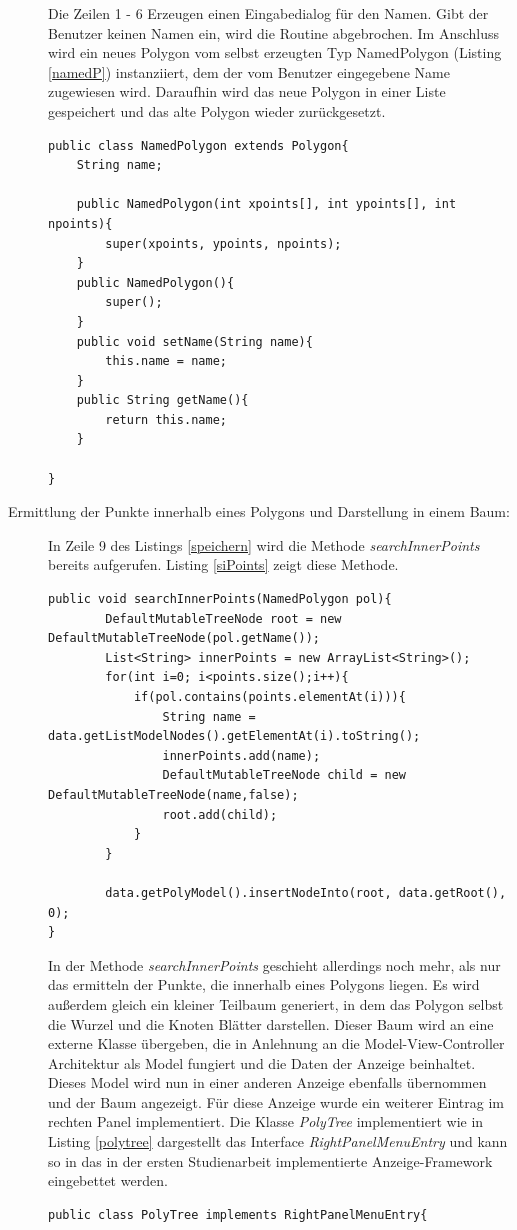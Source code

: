 \begin{description}
Die Zeilen 1 - 6 Erzeugen einen Eingabedialog für den Namen. Gibt der Benutzer keinen Namen ein, wird die Routine abgebrochen. Im Anschluss wird ein neues Polygon vom selbst erzeugten Typ NamedPolygon (Listing \ref{namedP}) instanziiert, dem der vom Benutzer eingegebene Name zugewiesen wird. Daraufhin wird das neue Polygon in einer Liste gespeichert und das alte Polygon wieder zurückgesetzt. 
\begin{lstlisting}[captionpos=b, caption=Klassendefinition des NamedPolygon, label=namedP]
public class NamedPolygon extends Polygon{
    String name;

    public NamedPolygon(int xpoints[], int ypoints[], int npoints){
        super(xpoints, ypoints, npoints);
    }
    public NamedPolygon(){
        super();
    }
    public void setName(String name){
        this.name = name;
    }
    public String getName(){
        return this.name;
    }

}
\end{lstlisting}

\item[Ermittlung der Punkte innerhalb eines Polygons und Darstellung in einem Baum:] In Zeile 9 des Listings \ref{speichern} wird die Methode \emph{searchInnerPoints} bereits aufgerufen. Listing \ref{siPoints} zeigt diese Methode.
\begin{lstlisting}[captionpos=b, caption=Methode searchInnerPoints, label=siPoints]
public void searchInnerPoints(NamedPolygon pol){
        DefaultMutableTreeNode root = new DefaultMutableTreeNode(pol.getName());
        List<String> innerPoints = new ArrayList<String>();
        for(int i=0; i<points.size();i++){
            if(pol.contains(points.elementAt(i))){
                String name = data.getListModelNodes().getElementAt(i).toString();
                innerPoints.add(name);
                DefaultMutableTreeNode child = new DefaultMutableTreeNode(name,false);
                root.add(child);
            }
        }
        
        data.getPolyModel().insertNodeInto(root, data.getRoot(), 0);
}
\end{lstlisting}

In der Methode \emph{searchInnerPoints} geschieht allerdings noch mehr, als nur das ermitteln der Punkte, die innerhalb eines Polygons liegen. Es wird außerdem gleich ein kleiner Teilbaum generiert, in dem das Polygon  selbst die Wurzel und die Knoten Blätter darstellen. Dieser Baum wird an eine externe Klasse übergeben, die in Anlehnung an die Model-View-Controller Architektur als Model fungiert und die Daten der Anzeige beinhaltet. Dieses Model wird nun in einer anderen Anzeige ebenfalls übernommen und der Baum angezeigt. Für diese Anzeige wurde ein weiterer Eintrag im rechten Panel implementiert. Die Klasse \emph{PolyTree} implementiert wie in Listing \ref{polytree} dargestellt das Interface \emph{RightPanelMenuEntry} und kann so in das in der ersten Studienarbeit implementierte Anzeige-Framework eingebettet werden.
\begin{lstlisting}[captionpos=b, caption=Klasse PolyTree, label=polytree]
public class PolyTree implements RightPanelMenuEntry{


\end{lstlisting}
\end{description}
